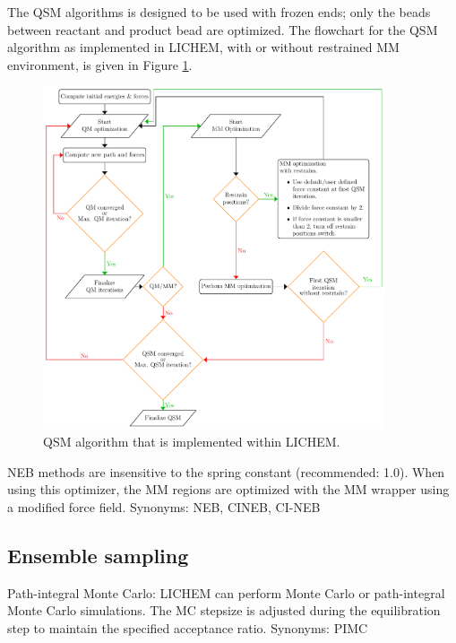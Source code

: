 \documentclass[12pt]{report}
\begin{document}
The QSM algorithms is designed to be used with frozen ends;
only the beads between reactant and product bead are optimized. The flowchart
for the QSM algorithm as implemented in LICHEM, with or without
restrained MM environment, is given in Figure \ref{fig:qsm}. \\

\begin{center}
\begin{figure}[ht!]
\centering
\includegraphics[width=0.9\textwidth]{../doc/images/qsm_flowchart.pdf}
\caption{QSM algorithm that is implemented within LICHEM.}
\label{fig:qsm}
\end{figure}
\end{center}

NEB methods are insensitive to the spring constant (recommended: 1.0).
When using this optimizer, the MM regions are optimized with the MM wrapper
using a modified force field.
Synonyms: NEB, CINEB, CI-NEB

\subsection{Ensemble sampling}

Path-integral Monte Carlo: LICHEM can perform Monte Carlo or path-integral
Monte Carlo simulations.
The MC stepsize is adjusted during the equilibration step to maintain the
specified acceptance ratio.
Synonyms: PIMC
\end{document}
